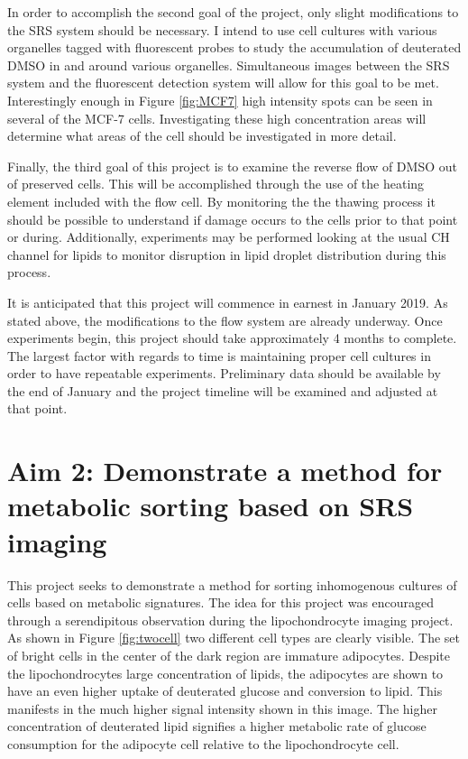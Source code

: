 In order to accomplish the second goal of the project, only slight modifications to the SRS system should be necessary.  I intend to use cell cultures with various organelles tagged with fluorescent probes to study the accumulation of deuterated DMSO in and around various organelles. Simultaneous images between the SRS system and the fluorescent detection system will allow for this goal to be met. Interestingly enough in Figure \ref{fig:MCF7} high intensity spots can be seen in several of the MCF-7 cells.  Investigating these high concentration areas will determine what areas of the cell should be investigated in more detail.

Finally, the third goal of this project is to examine the reverse flow of DMSO out of preserved cells. This will be accomplished through the use of the heating element included with the flow cell. By monitoring the the thawing process it should be possible to understand if damage occurs to the cells prior to that point or during.  Additionally, experiments may be performed looking at the usual CH channel for lipids to monitor disruption in lipid droplet distribution during this process. 

It is anticipated that this project will commence in earnest in January 2019.  As stated above, the modifications to the flow system are already underway.  Once experiments begin, this project should take approximately 4 months to complete.  The largest factor with regards to time is maintaining proper cell cultures in order to have repeatable experiments.  Preliminary data should be available by the end of January and the project timeline will be examined and adjusted at that point.

\section{Aim 2: Demonstrate a method for metabolic sorting based on SRS imaging}

This project seeks to demonstrate a method for sorting inhomogenous cultures of cells based on metabolic signatures.  The idea for this project was encouraged through a serendipitous observation during the lipochondrocyte imaging project.  As shown in Figure \ref{fig:twocell} two different cell types are clearly visible.  The set of bright cells in the center of the dark region are immature adipocytes.  Despite the lipochondrocytes large concentration of lipids, the adipocytes are shown to have an even higher uptake of deuterated glucose and conversion to lipid.  This manifests in the much higher signal intensity shown in this image. The higher concentration of deuterated lipid signifies a higher metabolic rate of glucose consumption for the adipocyte cell relative to the lipochondrocyte cell. 

